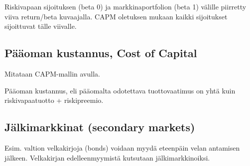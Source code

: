 \documentclass[a4paper]{article}
\begin{document}
Riskivapaan sijoituksen (beta 0) ja markkinaportfolion (beta 1) välille piirretty viiva return/beta kuvaajalla. CAPM oletuksen mukaan kaikki sijoitukset sijoittuvat tälle viivalle.

\subsection{Pääoman kustannus, Cost of Capital}

Mitataan CAPM-mallin avulla. 

Pääoman kustannus, eli pääomalta odotettava tuottovaatimus on yhtä kuin riskivapaatuotto + riskipreemio.

\subsection{Jälkimarkkinat (secondary markets)}

Esim. valtion velkakirjoja (bonds) voidaan myydä eteenpäin velan antamisen jälkeen. Velkakirjan edelleenmyymistä kutsutaan jälkimarkkinoiksi.
\end{document}

